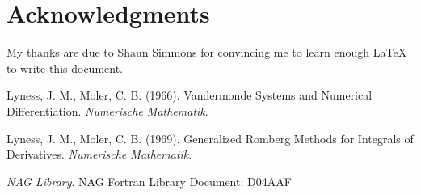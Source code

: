 \documentclass[a4paper,11pt]{article}
\begin{document}
\bigskip

\section{Acknowledgments}

My thanks are due to Shaun Simmons for convincing me to learn enough
LaTeX to write this document.

\bigskip


\begin{thebibliography}{3}

 Lyness, J. M., Moler, C. B. (1966).
\newblock Vandermonde Systems and Numerical Differentiation.
\newblock \emph{Numerische Mathematik}.

 Lyness, J. M., Moler, C. B. (1969).
\newblock Generalized Romberg Methods for Integrals of Derivatives.
\newblock \emph{Numerische Mathematik}.

 \emph{NAG Library}.
\newblock NAG Fortran Library Document: D04AAF

\end{thebibliography}
\end{document}
